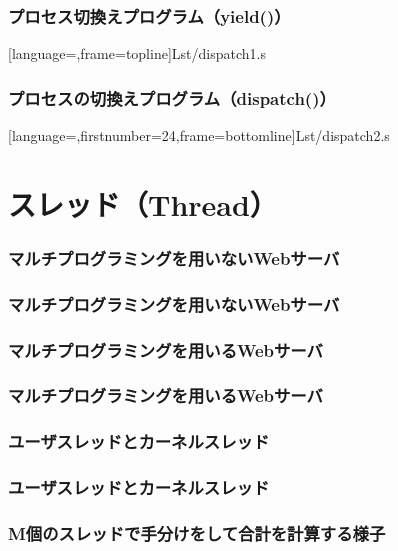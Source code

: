 \documentclass[dvipdfmx]{beamer}
\begin{document}
\begin{frame}[fragile]
  \frametitle{プロセス切換えプログラム（yield()）}
  
      [language=,frame=topline]{Lst/dispatch1.s}
\end{frame}

\begin{frame}[fragile]
  \frametitle{プロセスの切換えプログラム（dispatch()）}
  
      [language=,firstnumber=24,frame=bottomline]{Lst/dispatch2.s}
\end{frame}

\section{スレッド（Thread）}
\begin{frame}
  \frametitle{マルチプログラミングを用いないWebサーバ}
\end{frame}

\begin{frame}
  \frametitle{マルチプログラミングを用いないWebサーバ}
\end{frame}

\begin{frame}
  \frametitle{マルチプログラミングを用いるWebサーバ}
\end{frame}

\begin{frame}
  \frametitle{マルチプログラミングを用いるWebサーバ}
\end{frame}

\begin{frame}
  \frametitle{ユーザスレッドとカーネルスレッド}
\end{frame}

\begin{frame}
  \frametitle{ユーザスレッドとカーネルスレッド}
\end{frame}

\begin{frame}
  \frametitle{M個のスレッドで手分けをして合計を計算する様子}
\end{frame}
\end{document}
